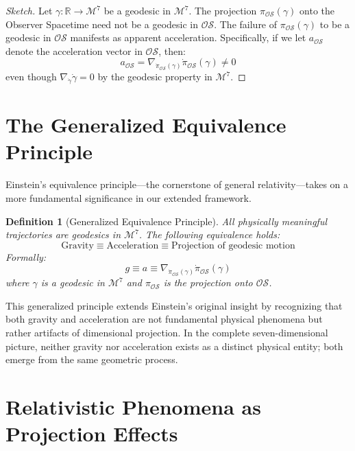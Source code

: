 \documentclass{article}
\newtheorem{definition}{Definition}
\begin{document}
\begin{proof}[Sketch]
Let $\gamma: \mathbb{R} \to \mathcal{M}^7$ be a geodesic in $\mathcal{M}^7$. The projection $\pi_{\mathcal{OS}}(\gamma)$ onto the Observer Spacetime need not be a geodesic in $\mathcal{OS}$. The failure of $\pi_{\mathcal{OS}}(\gamma)$ to be a geodesic in $\mathcal{OS}$ manifests as apparent acceleration. Specifically, if we let $a_{\mathcal{OS}}$ denote the acceleration vector in $\mathcal{OS}$, then:
\begin{equation}
a_{\mathcal{OS}} = \nabla_{\dot{\pi}_{\mathcal{OS}}(\gamma)}\dot{\pi}_{\mathcal{OS}}(\gamma) \neq 0
\end{equation}
even though $\nabla_{\dot{\gamma}}\dot{\gamma} = 0$ by the geodesic property in $\mathcal{M}^7$.
\end{proof}

\section{The Generalized Equivalence Principle}

Einstein's equivalence principle—the cornerstone of general relativity—takes on a more fundamental significance in our extended framework.

\begin{definition}[Generalized Equivalence Principle]
All physically meaningful trajectories are geodesics in $\mathcal{M}^7$. The following equivalence holds:
\begin{equation}
\text{Gravity} \equiv \text{Acceleration} \equiv \text{Projection of geodesic motion}
\end{equation}
Formally:
\begin{equation}
g \equiv a \equiv \nabla_{\dot{\pi}_{\mathcal{OS}}(\gamma)}\dot{\pi}_{\mathcal{OS}}(\gamma)
\end{equation}
where $\gamma$ is a geodesic in $\mathcal{M}^7$ and $\pi_{\mathcal{OS}}$ is the projection onto $\mathcal{OS}$.
\end{definition}

This generalized principle extends Einstein's original insight by recognizing that both gravity and acceleration are not fundamental physical phenomena but rather artifacts of dimensional projection. In the complete seven-dimensional picture, neither gravity nor acceleration exists as a distinct physical entity; both emerge from the same geometric process.

\section{Relativistic Phenomena as Projection Effects}
\end{document}
